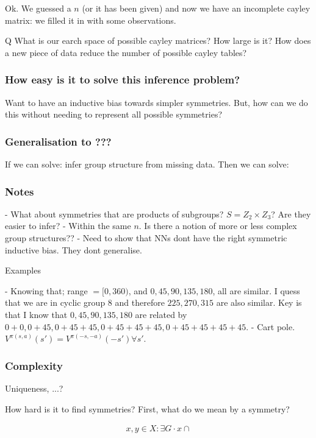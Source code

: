 Ok. We guessed a $n$ (or it has been given) and now we have an incomplete cayley matrix: we filled it in with some observations.

Q What is our earch space of possible cayley matrices? How large is it?
How does a new piece of data reduce the number of possible cayley tables?

\subsubsection{How easy is it to solve this inference problem?}

Want to have an inductive bias towards simpler symmetries. But, how can we do this without needing to represent all possible symmetries?


\subsubsection{Generalisation to ???}

If we can solve: infer group structure from missing data.
Then we can solve:

\subsubsection{Notes}

- What about symmetries that are products of subgroups? $S = Z_2 \times Z_3$?
Are they easier to infer?
- Within the same $n$. Is there a notion of more or less complex group structures??
- Need to show that NNs dont have the right symmetric inductive bias. They dont generalise.

Examples

- Knowing that; range $= [0,360)$, and $0, 45, 90, 135, 180$, all are similar. I quess that we are in cyclic group $8$ and therefore $225, 270, 315$ are also similar. Key is that I know that $0, 45, 90, 135, 180$ are related by $0+0, 0+45, 0+45+45, 0+45+45+45, 0+45+45+45+45$.
- Cart pole. $V^{\pi(s, a)}(s') = V^{\pi(-s, -a)}(-s') \forall s'$.



\subsubsection{Complexity}

Uniqueness, ...?

How hard is it to find symmetries?
First, what do we mean by a symmetry?

\begin{align}
x, y \in X : \exists G \cdot x \cap
\end{align}




